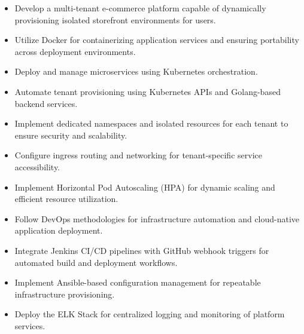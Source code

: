 \documentclass[12pt,a4paper]{report}
\begin{document}
\begin{itemize}

    \item Develop a multi-tenant e-commerce platform capable of dynamically provisioning isolated storefront environments for users.

    \item Utilize Docker for containerizing application services and ensuring portability across deployment environments.

    \item Deploy and manage microservices using Kubernetes orchestration.

    \item Automate tenant provisioning using Kubernetes APIs and Golang-based backend services.

    \item Implement dedicated namespaces and isolated resources for each tenant to ensure security and scalability.

    \item Configure ingress routing and networking for tenant-specific service accessibility.

    \item Implement Horizontal Pod Autoscaling (HPA) for dynamic scaling and efficient resource utilization.

    \item Follow DevOps methodologies for infrastructure automation and cloud-native application deployment.

    \item Integrate Jenkins CI/CD pipelines with GitHub webhook triggers for automated build and deployment workflows.

    \item Implement Ansible-based configuration management for repeatable infrastructure provisioning.

    \item Deploy the ELK Stack for centralized logging and monitoring of platform services.

\end{itemize}












\newpage
\end{document}
